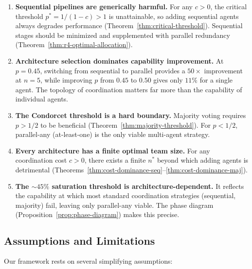 \documentclass[12pt,a4paper]{article}
\theoremstyle{plain}
\theoremstyle{definition}
\theoremstyle{remark}
\begin{document}
\begin{enumerate}
  \item \textbf{Sequential pipelines are generically harmful.}
    For any $c > 0$, the critical threshold $p^* = 1/(1-c) > 1$ is
    unattainable, so adding sequential agents always degrades performance
    (Theorem~\ref{thm:critical-threshold}).  Sequential stages should be
    minimized and supplemented with parallel redundancy
    (Theorem~\ref{thm:r4-optimal-allocation}).

  \item \textbf{Architecture selection dominates capability improvement.}
    At $p = 0.45$, switching from sequential to parallel provides a
    $50\times$ improvement at $n = 5$, while improving $p$ from $0.45$ to
    $0.50$ gives only $11\%$ for a single agent.  The topology of coordination
    matters far more than the capability of individual agents.

  \item \textbf{The Condorcet threshold is a hard boundary.}
    Majority voting requires $p > 1/2$ to be beneficial
    (Theorem~\ref{thm:majority-threshold}).  For $p < 1/2$, parallel-any
    (at-least-one) is the only viable multi-agent strategy.

  \item \textbf{Every architecture has a finite optimal team size.}
    For any coordination cost $c > 0$, there exists a finite $n^*$ beyond
    which adding agents is detrimental
    (Theorems~\ref{thm:cost-dominance-seq}--\ref{thm:cost-dominance-maj}).

  \item \textbf{The $\sim\!45\%$ saturation threshold is architecture-dependent.}
    It reflects the capability at which most standard coordination strategies
    (sequential, majority) fail, leaving only parallel-any viable.  The
    phase diagram (Proposition~\ref{prop:phase-diagram}) makes this precise.
\end{enumerate}

\subsection{Assumptions and Limitations}

Our framework rests on several simplifying assumptions:
\end{document}
